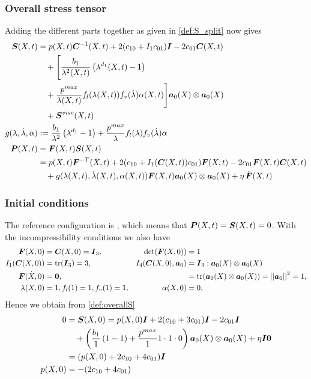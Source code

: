 \subsubsection{Overall stress tensor}
Adding the different parts together as given in \eqref{def:S_split} now gives
\begin{align}
	\boldsymbol{S}(X,t) &= p(X,t)\boldsymbol{C}^{-1}(X,t) + 2(c_{10} + I_1c_{01})\boldsymbol{I} - 2c_{01}\boldsymbol{C}(X,t)\label{def:overallS}\\
			 &\quad+\Biggl[\frac{b_1}{\lambda^2(X,t)}\left(\lambda^{d_1}(X,t) - 1\right)\nonumber\\
			 &\quad+\frac{p^{max}}{\lambda(X,t)}f_l(\lambda(X,t))f_v(\dot{\lambda})\alpha(X,t)\Biggr]\boldsymbol{a}_0(X)\otimes\boldsymbol{a}_0(X)\\
			 &\quad+\boldsymbol{S}^{visc}(X,t)\nonumber\\
	g(\lambda,\dot{\lambda},\alpha)&:= \frac{b_1}{\lambda^2}\left(\lambda^{d_1} - 1\right)
		+\frac{p^{max}}{\lambda}f_l(\lambda)f_v(\dot{\lambda})\alpha\label{def:g}\\			 
	\boldsymbol{P}(X,t) &= \boldsymbol{F}(X,t)\boldsymbol{S}(X,t)\label{def:completeP}\\
			 &= p(X,t)\boldsymbol{F}^{-T}(X,t) + 2(c_{10} + I_1(\boldsymbol{C}(X,t))c_{01})\boldsymbol{F}(X,t) - 2c_{01}\boldsymbol{F}(X,t)\boldsymbol{C}(X,t)\nonumber\\
			 &\quad+g(\lambda(X,t),\dot{\lambda}(X,t),\alpha(X,t))\boldsymbol{F}(X,t)\boldsymbol{a}_0(X)\otimes\boldsymbol{a}_0(X)+\eta\,\dot{\boldsymbol{F}}(X,t)\nonumber
\end{align}

\subsubsection{Initial conditions}
The reference configuration is , which means that $\boldsymbol{P}(X,t) = \boldsymbol{S}(X,t) = 0$.
With the incompressibility conditions we also have
\begin{align*}
	\boldsymbol{F}(X,0) &= \boldsymbol{C}(X,0) = \boldsymbol{I}_3, & \det(\boldsymbol{F}(X,0)) &= 1\\
	I_1(\boldsymbol{C}(X,0)) &= \operatorname{tr}(\boldsymbol{I}_3) = 3, & I_4(\boldsymbol{C}(X,0),\boldsymbol{a}_0) & = \boldsymbol{I}_3 : \boldsymbol{a}_0(X)\otimes\boldsymbol{a}_0(X)\\
		\dot{\boldsymbol{F}(X,0)}&=\boldsymbol{0},&&	= \operatorname{tr}(\boldsymbol{a}_0(X)\otimes\boldsymbol{a}_0(X)) = \left|\left|\boldsymbol{a}_0\right|\right|_{}^2 = 1,\\
		\lambda(X,0) &= 1, f_l(1) = 1, f_v(1) = 1, & \alpha(X,0) &= 0,
\end{align*}
Hence we obtain from \eqref{def:overallS}
\begin{align}
	0 &= \boldsymbol{S}(X,0) = p(X,0)\boldsymbol{I} + 2(c_{10} + 3c_{01})\boldsymbol{I} - 2c_{01}\boldsymbol{I}\\
			 &\quad+\left(\frac{b_1}{1}\left(1 - 1\right)+\frac{p^{max}}{1}1\cdot1\cdot0\right)\boldsymbol{a}_0(X)\otimes\boldsymbol{a}_0(X)
			 +\eta\boldsymbol{I}\boldsymbol{0}\nonumber\\
			 & = (p(X,0) + 2c_{10} + 4c_{01})\boldsymbol{I}\\
			 p(X,0) &= -(2c_{10} + 4c_{01})
\end{align}

